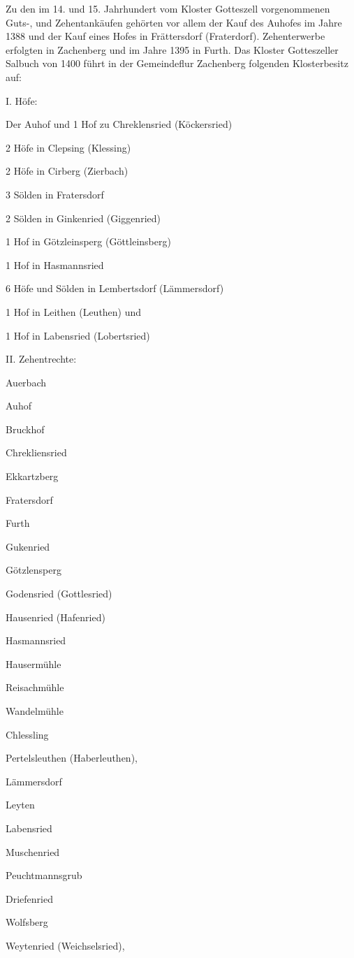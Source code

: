 \documentclass[12pt,a4pager]{book}
\begin{document}
Zu den im 14. und 15. Jahrhundert vom Kloster Gotteszell vorgenommenen Guts-,
und Zehentankäufen gehörten vor allem der Kauf des Auhofes im Jahre 1388 und der
Kauf eines Hofes in Frättersdorf (Fraterdorf). Zehenterwerbe erfolgten in
Zachenberg und im Jahre 1395 in Furth. Das Kloster Gotteszeller Salbuch von 1400
führt in der Gemeindeflur Zachenberg folgenden Klosterbesitz auf:

I. Höfe:

Der Auhof und 1 Hof zu Chreklensried (Köckersried)

2 Höfe in Clepsing (Klessing)

2 Höfe in Cirberg (Zierbach)

3 Sölden in Fratersdorf

2 Sölden in Ginkenried (Giggenried)

1 Hof in Götzleinsperg (Göttleinsberg)

1 Hof in Hasmannsried

6 Höfe und Sölden in Lembertsdorf (Lämmersdorf)

1 Hof in Leithen (Leuthen) und

1 Hof in Labensried (Lobertsried)

II. Zehentrechte:

Auerbach

Auhof

Bruckhof

Chrekliensried

Ekkartzberg

Fratersdorf

Furth

Gukenried

Götzlensperg

Godensried (Gottlesried)

Hausenried (Hafenried)

Hasmannsried

Hausermühle

Reisachmühle

Wandelmühle

Chlessling

Pertelsleuthen (Haberleuthen),

Lämmersdorf

Leyten

Labensried

Muschenried

Peuchtmannsgrub

Driefenried

Wolfsberg

Weytenried (Weichselsried),
\end{document}
